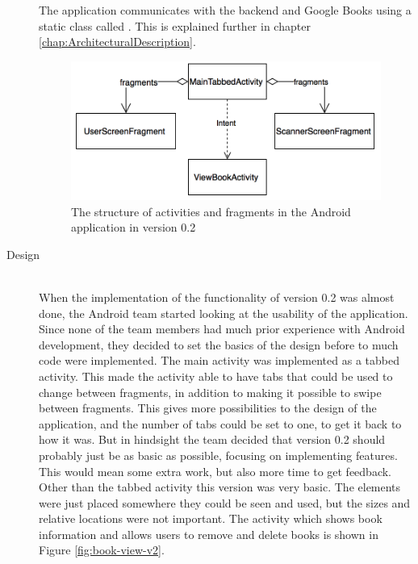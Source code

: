 \begin{description}
The application communicates with the \gls{backend} and Google Books using a static class called . This is explained further in chapter \ref{chap:ArchitecturalDescription}. 

\begin{figure}
\centering
\includegraphics[width = \textwidth]{figs/v02/AndroidStructure02.png}
\caption{The structure of activities and fragments in the Android application in version 0.2}
\label{fig:Android-structure-0.2}
\end{figure}

\item[Design] \hfill\\
When the implementation of the functionality of version 0.2 was almost done, the Android team started looking at the usability of the application. Since none of the team members had much prior experience with Android development, they decided to set the basics of the design before to much code were implemented. The main activity was implemented as a tabbed activity. This made the activity able to have tabs that could be used to change between fragments, in addition to making it possible to swipe between fragments. This gives more possibilities to the design of the application, and the number of tabs could be set to one, to get it back to how it was. But in hindsight the team decided that version 0.2 should probably just be as basic as possible, focusing on implementing features. This would mean some extra work, but also more time to get feedback. Other than the tabbed activity this version was very basic. The elements were just placed somewhere they could be seen and used, but the sizes and relative locations were not important. The activity which shows book information and allows users to remove and delete books is shown in Figure \ref{fig:book-view-v2}.


\end{description}
